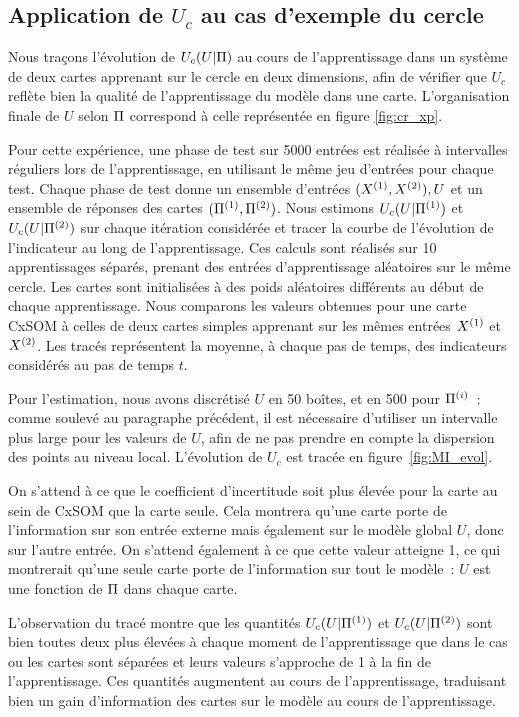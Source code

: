 \documentclass[../main]{subfiles}
\begin{document}
\subsection{Application de  $U_c$ au cas d'exemple du cercle}

Nous traçons l'évolution de $U_c(U|\Pi)$ au cours de l'apprentissage dans un système de deux cartes apprenant sur le cercle en deux dimensions, afin de vérifier que $U_c$ reflète bien la qualité de l'apprentissage du modèle dans une carte. L'organisation finale de $U$ selon $\Pi$ correspond à celle représentée en figure \ref{fig:cr_xp}.

Pour cette expérience, une phase de test sur 5000 entrées est réalisée à intervalles réguliers lors de l'apprentissage, en utilisant le même jeu d'entrées pour chaque test. Chaque phase de test donne un ensemble d'entrées $(X^{({1})}, X^{({2})}), U$ et un ensemble de réponses des cartes $(\Pi^{({1})}, \Pi^{({2})})$. Nous estimons  $U_c(U|\Pi^{({1})})$ et $U_c(U|\Pi^{({2})})$ sur chaque itération considérée et tracer la courbe de l'évolution de l'indicateur au long de l'apprentissage.
Ces calculs sont réalisés sur 10 apprentissages séparés, prenant des entrées d'apprentissage aléatoires sur le même cercle. Les cartes sont initialisées à des poids aléatoires différents au début de chaque apprentissage. 
Nous comparons les valeurs obtenues pour une carte CxSOM à celles de deux cartes simples apprenant sur les mêmes entrées $X^{({1})}$ et $X^{({2})}$. Les tracés représentent la moyenne, à chaque pas de temps, des indicateurs considérés au pas de temps $t$.

Pour l'estimation, nous avons discrétisé $U$ en 50 boîtes, et en 500 pour $\Pi^{({i})}$~: comme soulevé au paragraphe précédent, il est nécessaire d'utiliser un intervalle plus large pour les valeurs de $U$, afin de ne pas prendre en compte la dispersion des points au niveau local.
L'évolution de $U_c$ est tracée en figure~\ref{fig:MI_evol}.

On s'attend à ce que le coefficient d'incertitude soit plus élevée pour la carte au sein de CxSOM que la carte seule. Cela montrera qu'une carte porte de l'information sur son entrée externe mais également sur le modèle global $U$, donc sur l'autre entrée.
On s'attend également à ce que cette valeur atteigne 1, ce qui montrerait qu'une seule carte porte de l'information sur tout le modèle~: $U$ est une fonction de $\Pi$ dans chaque carte.

L'observation du tracé montre que les quantités $U_c(U|\Pi^{({1})})$ et $U_c(U|\Pi^{({2})})$ sont bien toutes deux plus élevées à chaque moment de l'apprentissage que dans le cas ou les cartes sont séparées et leurs valeurs s'approche de 1 à la fin de l'apprentissage.
Ces quantités augmentent au cours de l'apprentissage, traduisant bien un gain d'information des cartes sur le modèle au cours de l'apprentissage.
\end{document}
